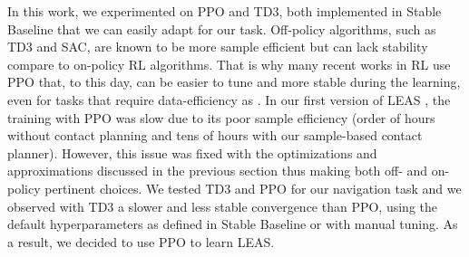 In this work, we experimented on PPO and TD3, both implemented in Stable Baseline \cite{stable-baselines} that we can easily adapt for our task.
Off-policy algorithms, such as TD3 and SAC, are known to be more sample efficient but can lack stability compare to on-policy RL algorithms.
That is why many recent works in RL use PPO \cite{survey_rl_animation_pettre_2022} that, to this day, can be easier to tune and more stable during the learning, even for tasks that require data-efficiency as \cite{openai2019dota}.
In our first version of LEAS \cite{LEAS}, the training with PPO was slow due to its poor sample efficiency (order of hours without contact planning and tens of hours with our sample-based contact planner). %
However, this issue was fixed with the optimizations and approximations discussed in the previous section thus making both off- and on-policy pertinent choices.
We tested TD3 and PPO for our navigation task and we observed with TD3 a slower and less stable convergence than PPO, using the default hyperparameters as defined in Stable Baseline or with manual tuning.
As a result, we decided to use PPO to learn LEAS.

